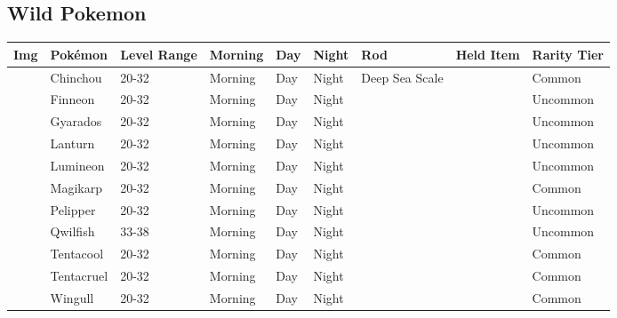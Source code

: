 \subsection{Wild Pokemon}%
\label{subsec:WildPokemon}%
\begin{longtable}{||l l l l l l l l l||}%
\hline%
Img&Pokémon&Level Range&Morning&Day&Night&Rod&Held Item&Rarity Tier\\%
\hline%
\endhead%
\hline%
&Chinchou&20{-}32&Morning&Day&Night&Deep Sea Scale&&Common\\%
\hline%
&Finneon&20{-}32&Morning&Day&Night&&&Uncommon\\%
\hline%
&Gyarados&20{-}32&Morning&Day&Night&&&Uncommon\\%
\hline%
&Lanturn&20{-}32&Morning&Day&Night&&&Uncommon\\%
\hline%
&Lumineon&20{-}32&Morning&Day&Night&&&Uncommon\\%
\hline%
&Magikarp&20{-}32&Morning&Day&Night&&&Common\\%
\hline%
&Pelipper&20{-}32&Morning&Day&Night&&&Uncommon\\%
\hline%
&Qwilfish&33{-}38&Morning&Day&Night&&&Uncommon\\%
\hline%
&Tentacool&20{-}32&Morning&Day&Night&&&Common\\%
\hline%
&Tentacruel&20{-}32&Morning&Day&Night&&&Common\\%
\hline%
&Wingull&20{-}32&Morning&Day&Night&&&Common\\%
\hline%
\end{longtable}